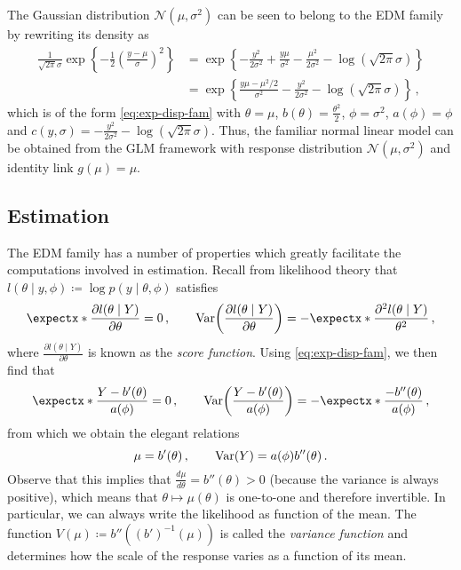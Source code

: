 \documentclass[a4paper]{book}
\begin{document}
The Gaussian distribution $\mathcal{N}(\mu, \sigma^2)$ can be seen to belong to the EDM family by rewriting its density as
\begin{align}
  \frac{1}{\sqrt{2 \pi} \sigma} \exp \left \{ -\frac{1}{2} \left( \frac{y - \mu}{\sigma} \right)^2\right \} & = \exp \left \{ -\frac{y^2}{2 \sigma^2} + \frac{y \mu}{\sigma^2} - \frac{\mu^2}{2 \sigma^2} - \log(\sqrt{2 \pi} \sigma) \right \} \\
                                                                                                            & = \exp \left \{ \frac{y \mu - \mu^2 / 2}{\sigma^2} - \frac{y^2}{2 \sigma^2} - \log(\sqrt{2 \pi} \sigma) \right \} \,,
\end{align}
which is of the form \cref{eq:exp-disp-fam} with $\theta = \mu$, $b(\theta) = \frac{\theta^2}{2}$, $\phi = \sigma^2$, $a(\phi) = \phi$ and $c(y, \sigma) = -\frac{y^2}{2 \sigma^2} - \log(\sqrt{2 \pi} \sigma)$. Thus, the familiar normal linear model can be obtained from the GLM framework with response distribution $\mathcal{N}(\mu, \sigma^2)$ and identity link $g(\mu) = \mu$.

\subsection{Estimation}

The EDM family has a number of properties which greatly facilitate the computations involved in estimation. Recall from likelihood theory that $l(\theta \mid y, \phi) \coloneqq \log p(y \mid \theta, \phi)$ satisfies
\begin{equation} \label{eq:exp-var-likelihood}
  \expect{\frac{\partial l(\theta \mid Y)}{\partial \theta}} = 0 \,, \qquad \var{\frac{\partial l(\theta \mid Y)}{\partial \theta}} = -\expect{\frac{\partial^2 l(\theta \mid Y)}{\theta^2}} \,,
\end{equation}
where $\frac{\partial l(\theta \mid Y)}{\partial \theta}$ is known as the \emph{score function}. Using \cref{eq:exp-disp-fam}, we then find that
\begin{equation}
  \expect{\frac{Y - b'(\theta)}{a(\phi)}} = 0 \,, \qquad \var{\frac{Y - b'(\theta)}{a(\phi)}} = -\expect{\frac{-b''(\theta)}{a(\phi)}} \,,
\end{equation}
from which we obtain the elegant relations
\begin{equation}
  \mu = b'(\theta) \,, \qquad \var{Y} = a(\phi) b''(\theta) \,.
\end{equation}
Observe that this implies that $\frac{d \mu}{d \theta} = b''(\theta) > 0$ (because the variance is always positive), which means that $\theta \mapsto \mu(\theta)$ is one-to-one and therefore invertible. In particular, we can always write the likelihood as function of the mean. The function $V(\mu) \coloneqq b''((b')^{-1}(\mu))$ is called the \emph{variance function} and determines how the scale of the response varies as a function of its mean.
\end{document}
